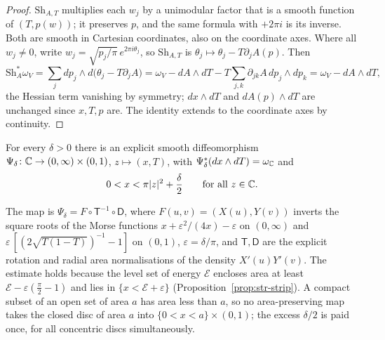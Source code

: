 \begin{proof}
$\mathrm{Sh}_{A,T}$ multiplies each $w_j$ by a unimodular factor that is a smooth function of $(T,p(w))$; it preserves $p$, and the
same formula with $+2\pi i$ is its inverse. Both are smooth in Cartesian coordinates, also on the coordinate axes. Where all
$w_j\ne0$, write $w_j=\sqrt{p_j/\pi}\,e^{2\pi i\theta_j}$, so $\mathrm{Sh}_{A,T}$ is $\theta_j\mapsto\theta_j-T\partial_jA(p)$. Then
\[
 \mathrm{Sh}_A^*\omega_V=\sum_jdp_j\wedge d\big(\theta_j-T\partial_jA\big)
 =\omega_V-dA\wedge dT-T\sum_{j,k}\partial_{jk}A\,dp_j\wedge dp_k=\omega_V-dA\wedge dT,
\]
the Hessian term vanishing by symmetry; $dx\wedge dT$ and $dA(p)\wedge dT$ are unchanged since $x,T,p$ are. The identity extends
to the coordinate axes by continuity.
\end{proof}

\begin{proposition}\label{prop:hdl-strip}
For every $\delta>0$ there is an explicit smooth diffeomorphism
$\Psi_\delta\colon\mathbb{C}\to(0,\infty)\times(0,1)$, $z\mapsto(x,T)$, with $\Psi_\delta^*(dx\wedge dT)=\omega_{\mathbb{C}}$ and
\[
 0<x<\pi|z|^2+\frac\delta2\qquad\text{for all }z\in\mathbb{C} .
\]
\end{proposition}

The map is $\Psi_\delta=F\circ\mathsf T^{-1}\circ\mathsf D$, where $F(u,v)=(X(u),Y(v))$ inverts the square roots of the Morse
functions $x+\varepsilon^2/(4x)-\varepsilon$ on $(0,\infty)$ and $\varepsilon\,[(2\sqrt{T(1-T)})^{-1}-1]$ on $(0,1)$,
$\varepsilon=\delta/\pi$, and $\mathsf T,\mathsf D$ are the explicit rotation and radial area normalisations of the density
$X'(u)Y'(v)$. The estimate holds because the level set of energy $\mathcal E$ encloses area at least
$\mathcal E-\varepsilon(\frac\pi2-1)$ and lies in $\{x<\mathcal E+\varepsilon\}$ (Proposition~\ref{prop:str-strip}). A compact subset of
an open set of area $a$ has area less than $a$, so no area-preserving map takes the closed disc of area $a$ into
$\{0<x<a\}\times(0,1)$; the excess $\delta/2$ is paid once, for all concentric discs simultaneously.


